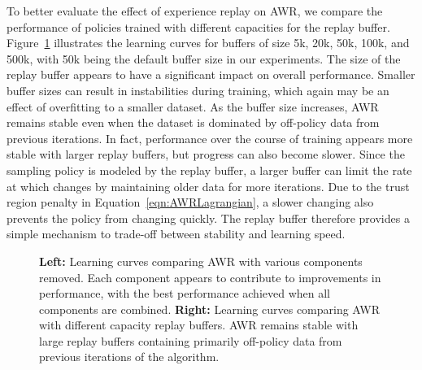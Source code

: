 \documentclass{article} \usepackage{iclr2020_conference,times}
\begin{document}
To better evaluate the effect of experience replay on AWR, we compare the performance of policies trained with different capacities for the replay buffer. Figure~\ref{fig:learningCurvesAblation} illustrates the learning curves for buffers of size 5k, 20k, 50k, 100k, and 500k, with 50k being the default buffer size in our experiments. The size of the replay buffer appears to have a significant impact on overall performance. Smaller buffer sizes can result in instabilities during training, which again may be an effect of overfitting to a smaller dataset. As the buffer size increases, AWR remains stable even when the dataset is dominated by off-policy data from previous iterations. In fact, performance over the course of training appears more stable with larger replay buffers, but progress can also become slower. Since the sampling policy  is modeled by the replay buffer, a larger buffer can limit the rate at which  changes by maintaining older data for more iterations. Due to the trust region penalty
in Equation~\ref{eqn:AWRLagrangian}, a slower changing  also prevents the policy  from changing quickly. The replay buffer therefore provides a simple mechanism to trade-off between stability and learning speed.

\begin{figure}[t]
	\centering
    \vspace{-0.5cm}
\caption{\textbf{Left:} Learning curves comparing AWR with various components removed. Each component appears to contribute to improvements in performance, with the best performance achieved when all components are combined. \textbf{Right:} Learning curves comparing AWR with different capacity replay buffers. AWR remains stable with large replay buffers containing primarily off-policy data from previous iterations of the algorithm.}
\label{fig:learningCurvesAblation}
\vspace{-0.3cm}
\end{figure}
\end{document}
